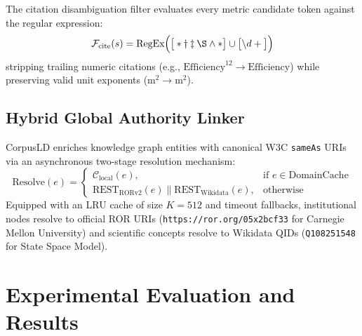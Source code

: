 \documentclass[conference]{IEEEtran}
\begin{document}
The citation disambiguation filter evaluates every metric candidate token against the regular expression:
\begin{equation}
\mathcal{F}_{\text{cite}}(s) = \text{RegEx}\Big( \big[ \ast \dagger \ddagger \S \wedge \text{\textasteriskcentered} \big] \cup \big[ \backslash d+ \big] \Big)
\end{equation}
stripping trailing numeric citations (e.g., $\text{Efficiency}^{12} \to \text{Efficiency}$) while preserving valid unit exponents ($\text{m}^2 \to \text{m}^2$).

\subsection{Hybrid Global Authority Linker}
CorpusLD enriches knowledge graph entities with canonical W3C \texttt{sameAs} URIs via an asynchronous two-stage resolution mechanism:
\begin{equation}
\text{Resolve}(e) = 
\begin{cases} 
\mathcal{C}_{\text{local}}(e), & \text{if } e \in \text{DomainCache} \\ 
\text{REST}_{\text{RORv2}}(e) \parallel \text{REST}_{\text{Wikidata}}(e), & \text{otherwise}
\end{cases}
\end{equation}
Equipped with an LRU cache of size $K=512$ and timeout fallbacks, institutional nodes resolve to official ROR URIs (\texttt{https://ror.org/05x2bcf33} for Carnegie Mellon University) and scientific concepts resolve to Wikidata QIDs (\texttt{Q108251548} for State Space Model).

\section{Experimental Evaluation and Results}
\end{document}
